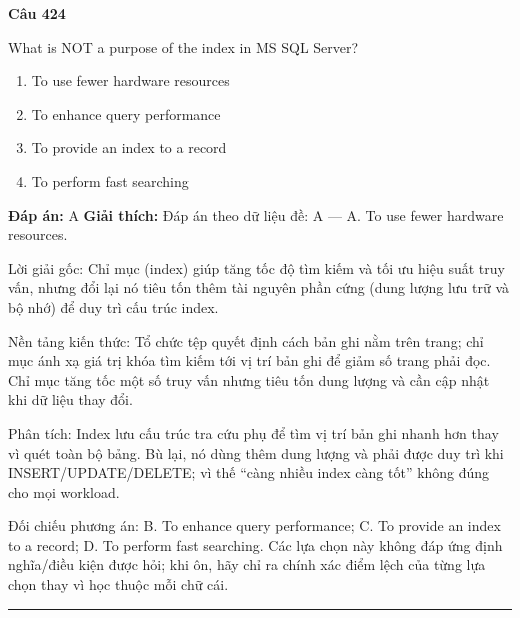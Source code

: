 \documentclass[11pt,a4paper]{article}
\newenvironment{question}[1]{%
  \par\vspace{1em}\noindent\textbf{\large Câu #1}\par\vspace{0.4em}
}{%
  \par\vspace{1em}\hrule\vspace{0.6em}
}
\newenvironment{choices}{%
  \begin{enumerate}[label=\textbf{\Alph*.},leftmargin=2.2em,itemsep=2pt,topsep=3pt]
}{%
  \end{enumerate}
}
\newcommand{\choice}{\item}
\begin{document}
\begin{question}{424}
What is NOT a purpose of the index in MS SQL Server?
\begin{choices}
\choice To use fewer hardware resources
\choice To enhance query performance
\choice To provide an index to a record
\choice To perform fast searching
\end{choices}
\textbf{Đáp án:} A
\textbf{Giải thích:} Đáp án theo dữ liệu đề: A — A. To use fewer hardware resources.

Lời giải gốc: Chỉ mục (index) giúp tăng tốc độ tìm kiếm và tối ưu hiệu suất truy vấn, nhưng đổi lại nó tiêu tốn thêm tài nguyên phần cứng (dung lượng lưu trữ và bộ nhớ) để duy trì cấu trúc index.

Nền tảng kiến thức: Tổ chức tệp quyết định cách bản ghi nằm trên trang; chỉ mục ánh xạ giá trị khóa tìm kiếm tới vị trí bản ghi để giảm số trang phải đọc. Chỉ mục tăng tốc một số truy vấn nhưng tiêu tốn dung lượng và cần cập nhật khi dữ liệu thay đổi.

Phân tích: Index lưu cấu trúc tra cứu phụ để tìm vị trí bản ghi nhanh hơn thay vì quét toàn bộ bảng. Bù lại, nó dùng thêm dung lượng và phải được duy trì khi INSERT/UPDATE/DELETE; vì thế “càng nhiều index càng tốt” không đúng cho mọi workload.

Đối chiếu phương án: B. To enhance query performance; C. To provide an index to a record; D. To perform fast searching. Các lựa chọn này không đáp ứng định nghĩa/điều kiện được hỏi; khi ôn, hãy chỉ ra chính xác điểm lệch của từng lựa chọn thay vì học thuộc mỗi chữ cái.
\end{question}
\end{document}
